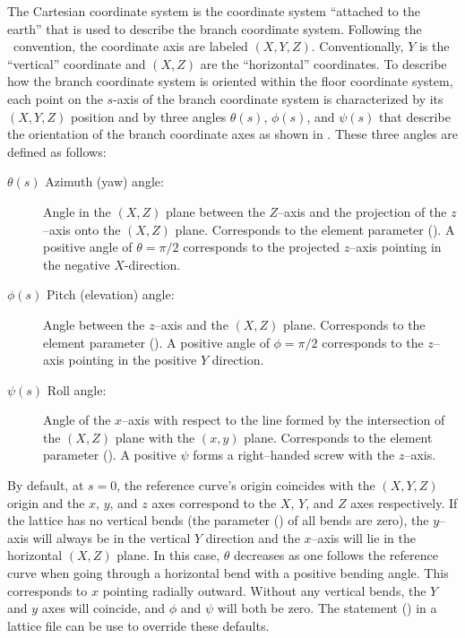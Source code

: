 The Cartesian  coordinate system is the
coordinate system ``attached to the earth'' that is used to describe the branch coordinate
system. Following the \mad\ convention, the  coordinate axis are labeled $(X, Y,
Z)$. Conventionally, $Y$ is the ``vertical'' coordinate and $(X, Z)$ are the ``horizontal''
coordinates. To describe how the branch coordinate system is oriented within the floor coordinate
system, each point on the $s$-axis of the branch coordinate system is characterized by its $(X, Y,
Z)$ position and by three angles $\theta(s)$, $\phi(s)$, and $\psi(s)$ that describe the orientation
of the branch coordinate axes as shown in . These three angles are defined as
follows:
\begin{description}
%
\item[$\theta(s)$ Azimuth (yaw) angle:] 
Angle in the $(X, Z)$ plane between the $Z$--axis and the projection of the $z$--axis onto the $(X,
Z)$ plane. Corresponds to the  element parameter (). A positive angle of
$\theta = \pi/2$ corresponds to the projected $z$--axis pointing in the negative $X$-direction.
%
\item[$\phi(s)$ Pitch (elevation) angle:] 
Angle between the $z$--axis and the $(X,Z)$ plane. Corresponds to the  element parameter
(). A positive angle of $\phi = \pi/2$ corresponds to the $z$--axis pointing in the
positive $Y$ direction.
%
\item[$\psi(s)$ Roll angle:] 
Angle of the $x$--axis with respect to the line formed by the intersection of the $(X, Z)$ plane
with the $(x, y)$ plane. Corresponds to the  element parameter (). A
positive $\psi$ forms a right--handed screw with the $z$--axis.
\end{description}

By default, at $s = 0$, the reference curve's origin coincides with the $(X, Y, Z)$ origin and the
$x$, $y$, and $z$ axes correspond to the $X$, $Y$, and $Z$ axes respectively. If the lattice has no
vertical bends (the  parameter () of all bends are zero), the $y$--axis
will always be in the vertical $Y$ direction and the $x$--axis will lie in the horizontal $(X,Z)$
plane. In this case, $\theta$ decreases as one follows the reference curve when going through a
horizontal bend with a positive bending angle. This corresponds to $x$ pointing radially
outward. Without any vertical bends, the $Y$ and $y$ axes will coincide, and $\phi$ and $\psi$ will
both be zero. The  statement () in a lattice file can be use to
override these defaults.

